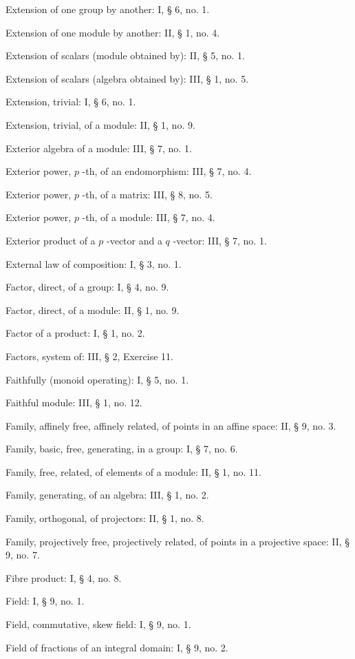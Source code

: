 Extension of one group by another: I, § 6, no. 1.

Extension of one module by another: II, § 1, no. 4.

Extension of scalars (module obtained by): II, § 5, no. 1.

Extension of scalars (algebra obtained by): III, § 1, no. 5.

Extension, trivial: I, § 6, no. 1.

Extension, trivial, of a module: II, § 1, no. 9.

Exterior algebra of a module: III, § 7, no. 1.

Exterior power, \(p\) -th, of an endomorphism: III, § 7, no. 4.

Exterior power, \(p\) -th, of a matrix: III, § 8, no. 5.

Exterior power, \(p\) -th, of a module: III, § 7, no. 4.

Exterior product of a \(p\) -vector and a \(q\) -vector: III, § 7, no. 1.

External law of composition: I, § 3, no. 1.

Factor, direct, of a group: I, § 4, no. 9.

Factor, direct, of a module: II, § 1, no. 9.

Factor of a product: I, § 1, no. 2.

Factors, system of: III, § 2, Exercise 11.

Faithfully (monoid operating): I, § 5, no. 1.

Faithful module: III, § 1, no. 12.

Family, affinely free, affinely related, of points in an affine space: II, § 9, no. 3.

Family, basic, free, generating, in a group: I, § 7, no. 6.

Family, free, related, of elements of a module: II, § 1, no. 11.

Family, generating, of an algebra: III, § 1, no. 2.

Family, orthogonal, of projectors: II, § 1, no. 8.

Family, projectively free, projectively related, of points in a projective space: II, § 9, no. 7.

Fibre product: I, § 4, no. 8.

Field: I, § 9, no. 1.

Field, commutative, skew field: I, § 9, no. 1.

Field of fractions of an integral domain: I, § 9, no. 2.

